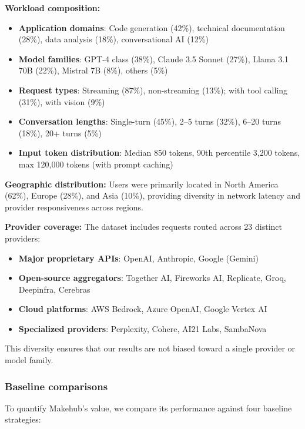 \documentclass[english]{article}
\begin{document}
\noindent\textbf{Workload composition:}
\begin{itemize}
    \item \textbf{Application domains}: Code generation (42\%), technical documentation (28\%), data analysis (18\%), conversational AI (12\%)
    \item \textbf{Model families}: GPT-4 class (38\%), Claude 3.5 Sonnet (27\%), Llama 3.1 70B (22\%), Mistral 7B (8\%), others (5\%)
    \item \textbf{Request types}: Streaming (87\%), non-streaming (13\%); with tool calling (31\%), with vision (9\%)
    \item \textbf{Conversation lengths}: Single-turn (45\%), 2--5 turns (32\%), 6--20 turns (18\%), 20+ turns (5\%)
    \item \textbf{Input token distribution}: Median 850 tokens, 90th percentile 3,200 tokens, max 120,000 tokens (with prompt caching)
\end{itemize}

\medskip

\noindent\textbf{Geographic distribution:}
Users were primarily located in North America (62\%), Europe (28\%), and Asia (10\%), providing diversity in network latency and provider responsiveness across regions.

\medskip

\noindent\textbf{Provider coverage:}
The dataset includes requests routed across 23 distinct providers:
\begin{itemize}
    \item \textbf{Major proprietary APIs}: OpenAI, Anthropic, Google (Gemini)
    \item \textbf{Open-source aggregators}: Together AI, Fireworks AI, Replicate, Groq, Deepinfra, Cerebras
    \item \textbf{Cloud platforms}: AWS Bedrock, Azure OpenAI, Google Vertex AI
    \item \textbf{Specialized providers}: Perplexity, Cohere, AI21 Labs, SambaNova
\end{itemize}

This diversity ensures that our results are not biased toward a single provider or model family.

\subsubsection{Baseline comparisons}

To quantify Makehub's value, we compare its performance against four baseline strategies:
\end{document}
